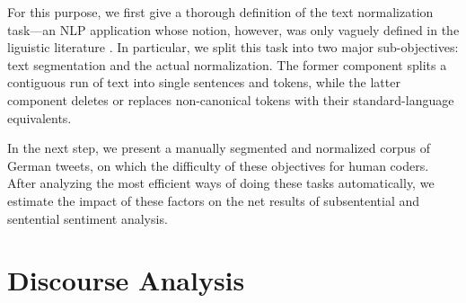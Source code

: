 \documentclass{article}
\begin{document}
For this purpose, we first give a thorough definition of the text
normalization task---an NLP application whose notion, however, was
only vaguely defined in the liguistic literature \cite{Eisenstein:13}.
In particular, we split this task into two major sub-objectives: text
segmentation and the actual normalization.  The former component
splits a contiguous run of text into single sentences and tokens,
while the latter component deletes or replaces non-canonical tokens
with their standard-language equivalents.

In the next step, we present a manually segmented and normalized
corpus of German tweets, on which the difficulty of these objectives
for human coders.  After analyzing the most efficient ways of doing
these tasks automatically, we estimate the impact of these factors on
the net results of subsentential and sentential sentiment analysis.

\section*{Discourse Analysis}



\end{document}
